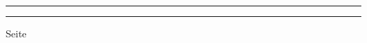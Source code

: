 \documentclass{slides}
\newcounter{mypage}
\begin{document}
\begin{center}
\end{center}


\rule{17cm}{1mm}

\footnotesize
\vspace*{0.2cm}

\scriptsize

\vspace*{\fill}
\tiny \addtocounter{mypage}{1}
\rule{17cm}{1mm}
  \hspace*{\fill} Seite 



\end{document}
